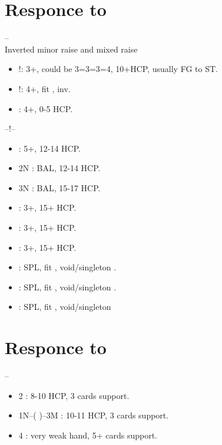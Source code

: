 \documentclass[12pt,twoside,a5paper]{report}%
\begin{document}
\chapter*{Responce to }
	-- \\

	Inverted minor raise and mixed raise
	\begin{itemize}
	\renewcommand{\labelitemi}{}
	\item {}!: 3+\di{}, could be 3=3=3=4, 10+HCP, usually FG to ST. 
	\item {}!: 4+\di{}, fit \di{}, inv.  
	\item {} : 4+\di{}, 0-5 HCP. 
	\end{itemize}

	--!--
	\begin{itemize}
	\renewcommand{\labelitemi}{}
	\item {} : 5+\di{}, 12-14 HCP.
	\item 2N : BAL, 12-14 HCP.
	\item 3N : BAL, 15-17 HCP.
	\item {} : 3+\he{}, 15+ HCP.
	\item {} : 3+\sp{}, 15+ HCP.
	\item {} : 3+\cl{}, 15+ HCP.
	\item {} : SPL, fit \di{}, void/singleton \he{}.
	\item {} : SPL, fit \di{}, void/singleton \sp{}.
	\item {} : SPL, fit \di{}, void/singleton \cl{}
	\end{itemize}

\chapter*{Responce to }
	-- \\
	\begin{itemize}
	\renewcommand{\labelitemi}{}
	\item 2\he{} : 8-10 HCP, 3 cards support.
	\item 1N--( )--3M : 10-11 HCP, 3 cards support.
	\item 4\he{} : very weak hand, 5+ cards support.
	\end{itemize}
\end{document}
